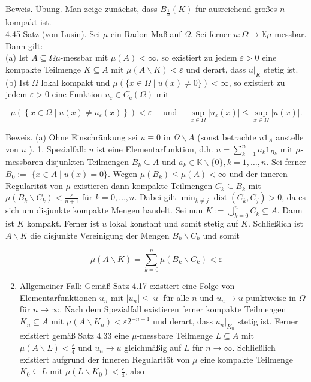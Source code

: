 \documentclass[10pt, letterpaper]{article}
\begin{document}
Beweis. Übung. Man zeige zunächst, dass $B_{\frac{1}{n}}(K)$ für ausreichend großes $n$ kompakt ist.\\
4.45 Satz (von Lusin). Sei $\mu$ ein Radon-Maß auf $\Omega$. Sei ferner $u: \Omega \rightarrow \mathbb{K} \mu$-messbar. Dann gilt:\\
(a) Ist $A \subseteq \Omega \mu$-messbar mit $\mu(A)<\infty$, so existiert zu jedem $\varepsilon>0$ eine kompakte Teilmenge $K \subseteq A$ mit $\mu(A \backslash K)<\varepsilon$ und derart, dass $\left.u\right|_{K}$ stetig ist.\\
(b) Ist $\Omega$ lokal kompakt und $\mu(\{x \in \Omega \mid u(x) \neq 0\})<\infty$, so existiert zu jedem $\varepsilon>0$ eine Funktion $u_{\varepsilon} \in C_{\mathrm{c}}(\Omega)$ mit

$$
\mu\left(\left\{x \in \Omega \mid u(x) \neq u_{\varepsilon}(x)\right\}\right)<\varepsilon \quad \text { und } \quad \sup _{x \in \Omega}\left|u_{\varepsilon}(x)\right| \leq \sup _{x \in \Omega}|u(x)| .
$$

Beweis. (a) Ohne Einschränkung sei $u \equiv 0$ in $\Omega \backslash A$ (sonst betrachte $u 1_{A}$ anstelle von $u$ ). 1. Spezialfall: $u$ ist eine Elementarfunktion, d.h. $u=\sum_{k=1}^{n} a_{k} 1_{B_{k}}$ mit $\mu$-messbaren disjunkten Teilmengen $B_{k} \subseteq A$ und $a_{k} \in \mathbb{K} \backslash\{0\}, k=1, \ldots, n$. Sei ferner $B_{0}:=$ $\{x \in A \mid u(x)=0\}$. Wegen $\mu\left(B_{k}\right) \leq \mu(A)<\infty$ und der inneren Regularität von $\mu$ existieren dann kompakte Teilmengen $C_{k} \subseteq B_{k}$ mit $\mu\left(B_{k} \backslash C_{k}\right)<\frac{\varepsilon}{n+1}$ für $k=0, \ldots, n$. Dabei gilt $\min _{k \neq j} \operatorname{dist}\left(C_{k}, C_{j}\right)>0$, da es sich um disjunkte kompakte Mengen handelt. Sei nun $K:=\bigcup_{k=0}^{n} C_{k} \subseteq A$. Dann ist $K$ kompakt. Ferner ist $u$ lokal konstant und somit stetig auf $K$. Schließlich ist $A \backslash K$ die disjunkte Vereinigung der Mengen $B_{k} \backslash C_{k}$ und somit

$$
\mu(A \backslash K)=\sum_{k=0}^{n} \mu\left(B_{k} \backslash C_{k}\right)<\varepsilon
$$

\begin{enumerate}
  \setcounter{enumi}{1}
  \item Allgemeiner Fall: Gemäß Satz 4.17 existiert eine Folge von Elementarfunktionen $u_{n}$ mit $\left|u_{n}\right| \leq|u|$ für alle $n$ und $u_{n} \rightarrow u$ punktweise in $\Omega$ für $n \rightarrow \infty$. Nach dem Spezialfall existieren ferner kompakte Teilmengen $K_{n} \subseteq A$ mit $\mu\left(A \backslash K_{n}\right)<\varepsilon 2^{-n-1}$ und derart, dass $\left.u_{n}\right|_{K_{n}}$ stetig ist. Ferner existiert gemäß Satz 4.33 eine $\mu$-messbare Teilmenge $L \subseteq A$ mit\\
$\mu(A \backslash L)<\frac{\varepsilon}{4}$ und $u_{n} \rightarrow u$ gleichmäßig auf $L$ für $n \rightarrow \infty$. Schließlich existiert aufgrund der inneren Regularität von $\mu$ eine kompakte Teilmenge $K_{0} \subseteq L$ mit $\mu\left(L \backslash K_{0}\right)<\frac{\varepsilon}{4}$, also
\end{enumerate}
\end{document}
